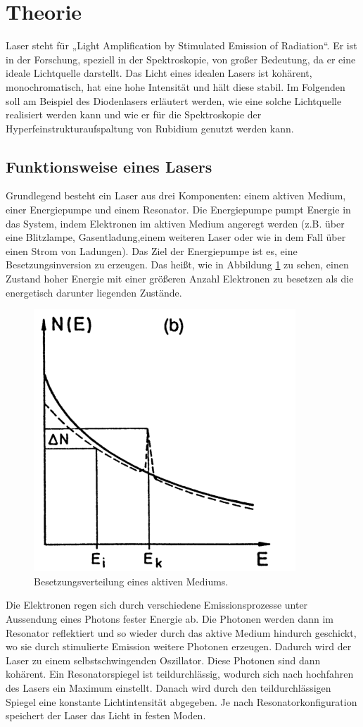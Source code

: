 \section{Theorie}
\label{sec:Theorie}
Laser steht für „Light Amplification by Stimulated Emission of Radiation“.
Er ist in der Forschung, speziell in der Spektroskopie, von großer Bedeutung, da er eine ideale Lichtquelle darstellt.
Das Licht eines idealen Lasers ist kohärent, monochromatisch, hat eine hohe Intensität und hält diese stabil.
Im Folgenden soll am Beispiel des Diodenlasers erläutert werden, wie eine solche Lichtquelle realisiert werden kann und 
wie er für die Spektroskopie der Hyperfeinstrukturaufspaltung von Rubidium genutzt werden kann.
\subsection{Funktionsweise eines Lasers}
Grundlegend besteht ein Laser aus drei Komponenten: einem aktiven Medium, einer Energiepumpe und einem Resonator.
Die Energiepumpe pumpt Energie in das System, indem Elektronen im aktiven Medium angeregt werden (z.B. über eine Blitzlampe, Gasentladung,einem weiteren Laser oder wie in dem Fall über einen Strom von Ladungen).
Das Ziel der Energiepumpe ist es, eine Besetzungsinversion zu erzeugen. Das heißt, wie in Abbildung \ref{fig:inv} zu sehen, einen Zustand hoher Energie mit einer größeren Anzahl Elektronen zu besetzen 
als die energetisch darunter liegenden Zustände.
\begin{figure}[H]
    \centering
    \includegraphics[scale=0.9]{pictures/Inv.png}
    \caption{Besetzungsverteilung eines aktiven Mediums\cite{Demtröder}.}
    \label{fig:inv}
\end{figure}
\noindent Die Elektronen regen sich durch verschiedene Emissionsprozesse unter Aussendung eines Photons fester Energie ab.
Die Photonen werden dann im Resonator reflektiert und so wieder durch das aktive Medium hindurch geschickt,
wo sie durch stimulierte Emission weitere Photonen erzeugen. Dadurch wird der Laser zu einem selbstschwingenden Oszillator.
Diese Photonen sind dann kohärent. Ein Resonatorspiegel ist teildurchlässig, wodurch sich nach hochfahren des Lasers ein Maximum einstellt. Danach wird durch den teildurchlässigen
Spiegel eine konstante Lichtintensität abgegeben. Je nach Resonatorkonfiguration speichert der Laser das Licht in festen Moden.
